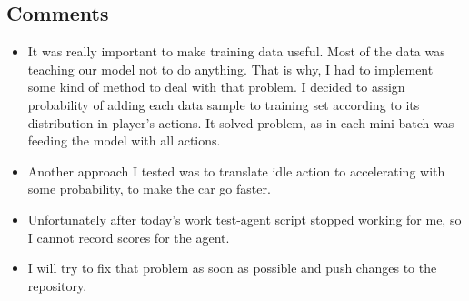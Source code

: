 \documentclass{scrartcl}
\begin{document}
\subsection*{Comments}

\begin{itemize}
	\item It was really important to make training data useful. Most of the data was teaching our model not to do anything. That is why, I had to implement some kind of method to deal with that problem. I decided to assign probability of adding each data sample to training set according to its distribution in player's actions. It solved problem, as in each mini batch was feeding the model with all actions. 

	\item Another approach I tested was to translate idle action to accelerating with some probability, to make the car go faster.
	\item Unfortunately after today's work test-agent script stopped working for me, so I cannot record scores for the agent.
	\item I will try to fix that problem as soon as possible and push changes to the repository.
\end{itemize}
\end{document}
